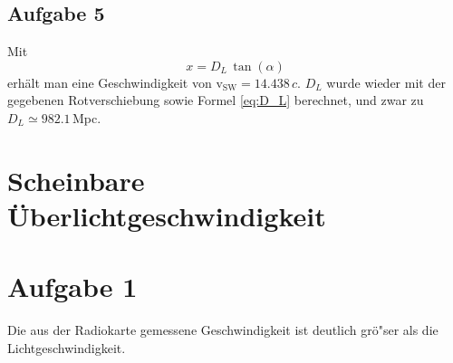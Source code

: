 \documentclass[12pt]{article}
\begin{document}
\subsection{Aufgabe 5}

Mit
\begin{equation*}
	x=D_L\,\tan(\alpha)
\end{equation*}
erh\"{a}lt man eine Geschwindigkeit von v$_\text{SW}=14.438\,c$. $D_L$ wurde wieder mit der gegebenen Rotverschiebung sowie Formel \ref{eq:D_L} berechnet, und zwar zu $D_L\simeq982.1$\,Mpc.


\section{Scheinbare \"{U}berlichtgeschwindigkeit}

\section{Aufgabe 1}

Die aus der Radiokarte gemessene Geschwindigkeit ist deutlich gr\"{o}"ser als die Lichtgeschwindigkeit. 















\pagebreak



\begin{thebibliography}{2}
\end{thebibliography}
\end{document}
